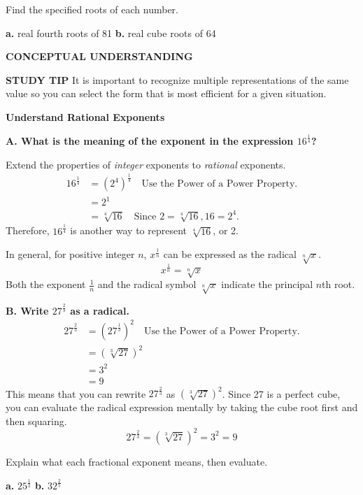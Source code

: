 \documentclass{article}
\newenvironment{example}[1]{}{}
\newenvironment{tryit}[1]{}{}
\begin{document}
\begin{tryit}{1}
Find the specified roots of each number.

\textbf{a.} real fourth roots of 81 \qquad \textbf{b.} real cube roots of 64
\end{tryit}

\textbf{CONCEPTUAL UNDERSTANDING}

\textbf{STUDY TIP}
It is important to recognize multiple representations of the same value so you can select the form that is most efficient for a given situation.

\begin{example}{2}
\textbf{Understand Rational Exponents}

\textbf{A. What is the meaning of the exponent in the expression $16^{\frac{1}{4}}$?}

Extend the properties of \textit{integer} exponents to \textit{rational} exponents.
\begin{align*}
16^{\frac{1}{4}} &= (2^4)^{\frac{1}{4}} \quad \text{Use the Power of a Power Property.} \\
&= 2^1 \\
&= \sqrt[4]{16} \quad \text{Since } 2 = \sqrt[4]{16}, 16 = 2^4.
\end{align*}
Therefore, $16^{\frac{1}{4}}$ is another way to represent $\sqrt[4]{16}$, or 2.

In general, for positive integer $n$, $x^{\frac{1}{n}}$ can be expressed as the radical $\sqrt[n]{x}$.
\[ x^{\frac{1}{n}} = \sqrt[n]{x} \]
Both the exponent $\frac{1}{n}$ and the radical symbol $\sqrt[n]{x}$ indicate the principal $n$th root.

\textbf{B. Write $27^{\frac{2}{3}}$ as a radical.}
\begin{align*}
27^{\frac{2}{3}} &= (27^{\frac{1}{3}})^2 \quad \text{Use the Power of a Power Property.} \\
&= (\sqrt[3]{27})^2 \\
&= 3^2 \\
&= 9
\end{align*}
This means that you can rewrite $27^{\frac{2}{3}}$ as $(\sqrt[3]{27})^2$. Since 27 is a perfect cube, you can evaluate the radical expression mentally by taking the cube root first and then squaring.
\[ 27^{\frac{2}{3}} = (\sqrt[3]{27})^2 = 3^2 = 9 \]
\end{example}

\begin{tryit}{2}
Explain what each fractional exponent means, then evaluate.

\textbf{a.} $25^{\frac{1}{2}}$ \qquad \textbf{b.} $32^{\frac{2}{5}}$
\end{tryit}
\end{document}
